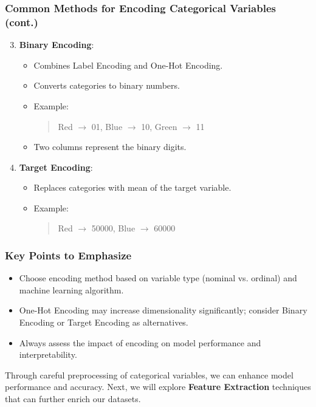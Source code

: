 \documentclass[aspectratio=169]{beamer}
\begin{document}
\begin{frame}
    \frametitle{Common Methods for Encoding Categorical Variables (cont.)}
    \begin{enumerate}
        \setcounter{enumi}{2}
        \item \textbf{Binary Encoding}:
            \begin{itemize}
                \item Combines Label Encoding and One-Hot Encoding.
                \item Converts categories to binary numbers.
                \item Example: 
                \begin{quote}
                    Red $\rightarrow$ 01, Blue $\rightarrow$ 10, Green $\rightarrow$ 11
                \end{quote}
                \item Two columns represent the binary digits.
            \end{itemize}

        \item \textbf{Target Encoding}:
            \begin{itemize}
                \item Replaces categories with mean of the target variable.
                \item Example: 
                \begin{quote}
                    Red $\rightarrow$ 50000, Blue $\rightarrow$ 60000 
                \end{quote}
            \end{itemize}
    \end{enumerate}
\end{frame}

\begin{frame}
    \frametitle{Key Points to Emphasize}
    \begin{itemize}
        \item Choose encoding method based on variable type (nominal vs. ordinal) and machine learning algorithm.
        \item One-Hot Encoding may increase dimensionality significantly; consider Binary Encoding or Target Encoding as alternatives.
        \item Always assess the impact of encoding on model performance and interpretability.
    \end{itemize}

    Through careful preprocessing of categorical variables, we can enhance model performance and accuracy. 
    Next, we will explore \textbf{Feature Extraction} techniques that can further enrich our datasets.
\end{frame}
\end{document}
